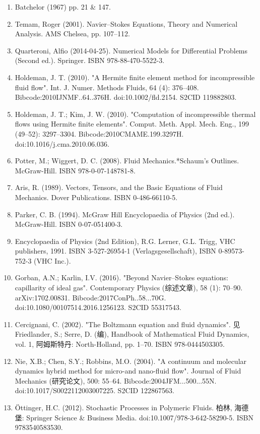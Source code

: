 \begin{enumerate}
\item Batchelor (1967) pp. 21 & 147.
\item Temam, Roger (2001). Navier–Stokes Equations, Theory and Numerical Analysis. AMS Chelsea, pp. 107–112.
\item Quarteroni, Alfio (2014-04-25). Numerical Models for Differential Problems (Second ed.). Springer. ISBN 978-88-470-5522-3.
\item Holdeman, J. T. (2010). "A Hermite finite element method for incompressible fluid flow". Int. J. Numer. Methods Fluids, 64 (4): 376–408. Bibcode:2010IJNMF..64..376H. doi:10.1002/fld.2154. S2CID 119882803.
\item Holdeman, J. T.; Kim, J. W. (2010). "Computation of incompressible thermal flows using Hermite finite elements". Comput. Meth. Appl. Mech. Eng., 199 (49–52): 3297–3304. Bibcode:2010CMAME.199.3297H. doi:10.1016/j.cma.2010.06.036.
\item Potter, M.; Wiggert, D. C. (2008). Fluid Mechanics.*Schaum's Outlines. McGraw-Hill. ISBN 978-0-07-148781-8.
\item Aris, R. (1989). Vectors, Tensors, and the Basic Equations of Fluid Mechanics. Dover Publications. ISBN 0-486-66110-5.
\item Parker, C. B. (1994). McGraw Hill Encyclopaedia of Physics (2nd ed.). McGraw-Hill. ISBN 0-07-051400-3.
\item Encyclopaedia of Physics (2nd Edition), R.G. Lerner, G.L. Trigg, VHC publishers, 1991. ISBN 3-527-26954-1 (Verlagsgesellschaft), ISBN 0-89573-752-3 (VHC Inc.).
\item Gorban, A.N.; Karlin, I.V. (2016). "Beyond Navier–Stokes equations: capillarity of ideal gas". Contemporary Physics (综述文章), 58 (1): 70–90. arXiv:1702.00831. Bibcode:2017ConPh..58...70G. doi:10.1080/00107514.2016.1256123. S2CID 55317543.
\item Cercignani, C. (2002). "The Boltzmann equation and fluid dynamics". 见 Friedlander, S.; Serre, D. (编), Handbook of Mathematical Fluid Dynamics, vol. 1, 阿姆斯特丹: North-Holland, pp. 1–70. ISBN 978-0444503305.
\item Nie, X.B.; Chen, S.Y.; Robbins, M.O. (2004). "A continuum and molecular dynamics hybrid method for micro-and nano-fluid flow". Journal of Fluid Mechanics (研究论文), 500: 55–64. Bibcode:2004JFM...500...55N. doi:10.1017/S0022112003007225. S2CID 122867563.
\item Öttinger, H.C. (2012). Stochastic Processes in Polymeric Fluids. 柏林, 海德堡: Springer Science & Business Media. doi:10.1007/978-3-642-58290-5. ISBN 9783540583530.

\end{enumerate}
